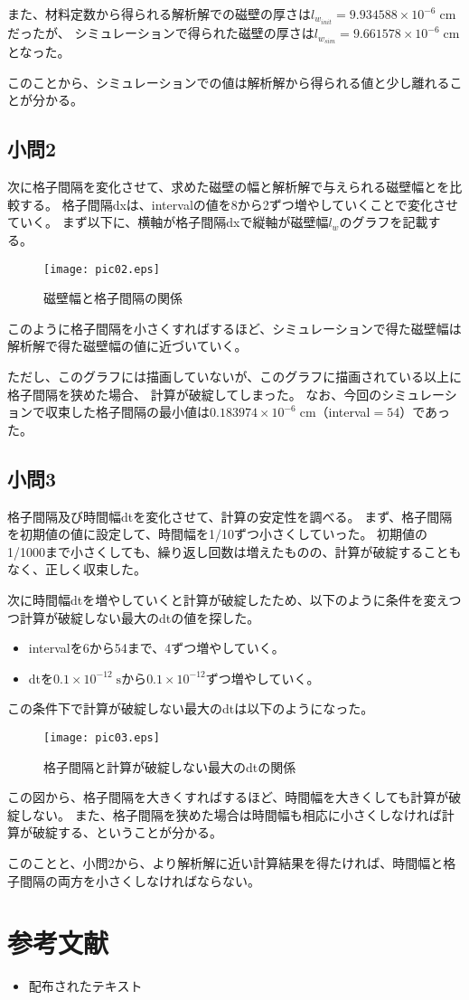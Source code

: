 \documentclass{jsarticle}
\begin{document}
また、材料定数から得られる解析解での磁壁の厚さは$l_{w_{init}} = 9.934588\times 10^{-6}\;\mathrm{cm}$だったが、
シミュレーションで得られた磁壁の厚さは$l_{w_{sim}} = 9.661578\times 10^{-6}\;\mathrm{cm}$となった。

このことから、シミュレーションでの値は解析解から得られる値と少し離れることが分かる。

\subsection{小問2}
次に格子間隔を変化させて、求めた磁壁の幅と解析解で与えられる磁壁幅とを比較する。
格子間隔dxは、intervalの値を8から2ずつ増やしていくことで変化させていく。
まず以下に、横軸が格子間隔dxで縦軸が磁壁幅$l_w$のグラフを記載する。
\begin{figure}[H]
	\centering
	\texttt{[image: pic02.eps]}
	\caption{磁壁幅と格子間隔の関係}
	\label{fig02}
\end{figure}

このように格子間隔を小さくすればするほど、シミュレーションで得た磁壁幅は
解析解で得た磁壁幅の値に近づいていく。

ただし、このグラフには描画していないが、このグラフに描画されている以上に格子間隔を狭めた場合、
計算が破綻してしまった。
なお、今回のシミュレーションで収束した格子間隔の最小値は$0.183974\times 10^{-6}\;\mathrm{cm}$（interval$=54$）であった。

\subsection{小問3}
格子間隔及び時間幅dtを変化させて、計算の安定性を調べる。
まず、格子間隔を初期値の値に設定して、時間幅を1/10ずつ小さくしていった。
初期値の1/1000まで小さくしても、繰り返し回数は増えたものの、計算が破綻することもなく、正しく収束した。

次に時間幅dtを増やしていくと計算が破綻したため、以下のように条件を変えつつ計算が破綻しない最大のdtの値を探した。
\begin{itemize}
 \item intervalを6から54まで、4ずつ増やしていく。
 \item dtを$0.1\times 10^{-12}\;\mathrm{s}$から$0.1\times 10^{-12}$ずつ増やしていく。
\end{itemize}
この条件下で計算が破綻しない最大のdtは以下のようになった。
\begin{figure}[H]
	\centering
	\texttt{[image: pic03.eps]}
	\caption{格子間隔と計算が破綻しない最大のdtの関係}
	\label{fig03}
\end{figure}

この図から、格子間隔を大きくすればするほど、時間幅を大きくしても計算が破綻しない。
また、格子間隔を狭めた場合は時間幅も相応に小さくしなければ計算が破綻する、ということが分かる。

このことと、小問2から、より解析解に近い計算結果を得たければ、時間幅と格子間隔の両方を小さくしなければならない。

\section{参考文献}

\begin{itemize}
  \item 配布されたテキスト
\end{itemize}
\end{document}
